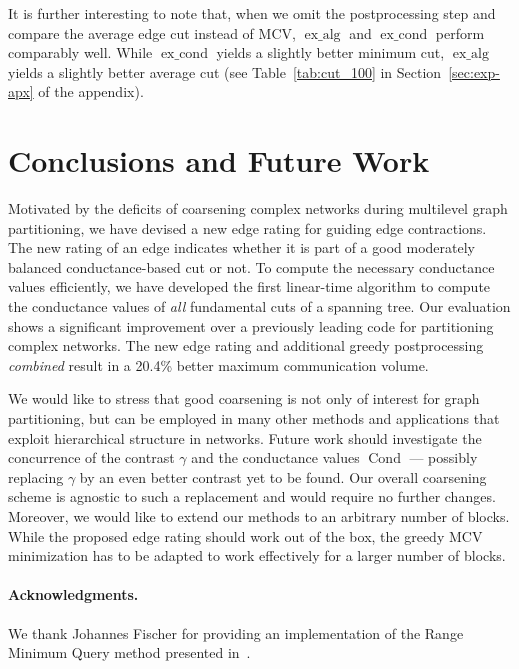 \documentclass[pdftex]{llncs}
\newcommand{\Cond}{\operatorname{Cond}}
\newcommand{\excond}{\operatorname{ex\_cond}}
\newcommand{\exalg}{\operatorname{ex\_alg}}
\numberwithin{equation}{section}
\numberwithin{example}{section}
\numberwithin{table}{section}
\begin{document}
It is further interesting to note that, when we omit the
postprocessing step and compare the average edge cut instead of MCV,
$\exalg$ and $\excond$ perform comparably well. While $\excond$ yields
a slightly better minimum cut, $\exalg$ yields a slightly better
average cut (see Table~\ref{tab:cut_100} in Section~\ref{sec:exp-apx}
of the appendix).





\section{Conclusions and Future Work}
\label{sec:conclusions}
Motivated by the deficits of coarsening complex networks during
multilevel graph partitioning, we have devised a new edge rating for
guiding edge contractions. The new rating of an edge indicates whether
it is part of a good moderately balanced conductance-based cut or
not. To compute the necessary conductance values efficiently, we have
developed the first linear-time algorithm to compute the conductance
values of \emph{all} fundamental cuts of a spanning tree.
Our evaluation shows a significant improvement over a previously leading
code for partitioning complex networks. 
The new edge rating and additional greedy postprocessing \emph{combined}
result in a 20.4\% better maximum communication volume.

We would like to stress that good coarsening is not only of interest
for graph partitioning, but can be employed in many other methods and
applications that exploit hierarchical structure in networks. Future
work should investigate the concurrence of the contrast $\gamma$ and
the conductance values $\Cond $ --- possibly replacing $\gamma$ by an
even better contrast yet to be found. Our overall coarsening scheme is
agnostic to such a replacement and would require no further
changes. Moreover, we would like to extend our methods to an arbitrary
number of blocks. While the proposed edge rating should work out of
the box, the greedy MCV minimization has to be adapted to work
effectively for a larger number of blocks.




\paragraph*{Acknowledgments.}
We thank Johannes Fischer for providing an implementation of
the Range Minimum Query method presented in~\cite{Fischer2006a}.
\end{document}
